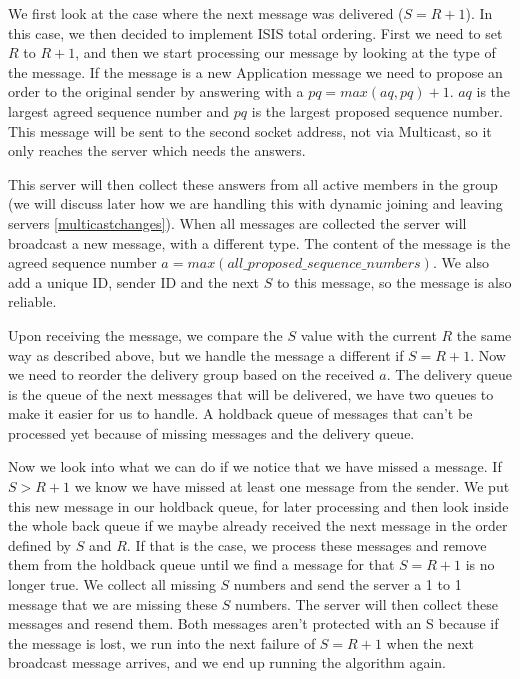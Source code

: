 \documentclass[runningheads]{llncs}
\begin{document}
We first look at the case where the next message was delivered ($S = R + 1$).
In this case, we then decided to implement ISIS total ordering.
First we need to set $R$ to $R + 1$, and then we start processing our message
by looking at the type of the message. If the message is a new Application
message we need to propose an order to the original sender by answering with a
$pq = max(aq, pq) + 1$. $aq$ is the largest agreed sequence number and $pq$ is
the largest proposed sequence number. This message will be sent to the second
socket address, not via Multicast, so it only reaches the server which needs
the answers.

This server will then collect these answers from all active members in the
group (we will discuss later how we are handling this with dynamic joining and
leaving servers \ref{multicastchanges}). When all messages are collected the
server will broadcast a new message, with a different type. The content of the
message is the agreed sequence number $a =
max(all\_proposed\_sequence\_numbers)$. We also add a unique ID, sender ID and
the next $S$ to this message, so the message is also reliable.

Upon receiving the message, we compare the $S$ value with the current $R$ the
same way as described above, but we handle the message a different if $S = R +
1$. Now we need to reorder the delivery group based on the received $a$. The
delivery queue is the queue of the next messages that will be delivered, we
have two queues to make it easier for us to handle. A holdback queue of
messages that can't be processed yet because of missing messages and the
delivery queue.

Now we look into what we can do if we notice that we have missed a message. If
$S > R + 1$ we know we have missed at least one message from the sender. We put
this new message in our holdback queue, for later processing and then look
inside the whole back queue if we maybe already received the next message in
the order defined by $S$ and $R$. If that is the case, we process these
messages and remove them from the holdback queue until we find a message for
that $S = R + 1$ is no longer true. We collect all missing $S$ numbers and send
the server a 1 to 1 message that we are missing these $S$ numbers. The server
will then collect these messages and resend them. Both messages aren't
protected with an S because if the message is lost, we run into the next
failure of $S = R + 1$ when the next broadcast message arrives, and we end up
running the algorithm again.
\end{document}
